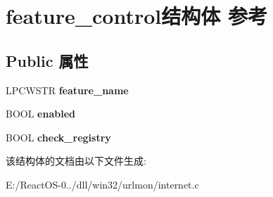 \hypertarget{structfeature__control}{}\section{feature\+\_\+control结构体 参考}
\label{structfeature__control}
\subsection*{Public 属性}
\begin{DoxyCompactItemize}
\item 
\mbox{\label{structfeature__control_a78e734828a5a49bece61491e746b022e}} 
L\+P\+C\+W\+S\+TR {\bfseries feature\+\_\+name}
\item 
\mbox{\label{structfeature__control_a911832c43509169e220ae05690379232}} 
B\+O\+OL {\bfseries enabled}
\item 
\mbox{\label{structfeature__control_a94e2615b4f1519b4302f19fa43362a9b}} 
B\+O\+OL {\bfseries check\+\_\+registry}
\end{DoxyCompactItemize}


该结构体的文档由以下文件生成\+:\begin{DoxyCompactItemize}
\item 
E\+:/\+React\+O\+S-\/0../dll/win32/urlmon/internet.\+c\end{DoxyCompactItemize}
